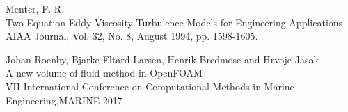 \documentclass[a4paper, 12pt]{report}
\begin{document}
\begin{thebibliography}{9}
	Menter, F. R.\\
	Two-Equation Eddy-Viscosity Turbulence Models for Engineering Applications\\
	AIAA Journal, Vol. 32, No. 8, August 1994, pp. 1598-1605.
	
	Johan Roenby, Bjarke Eltard Larsen, Henrik Bredmose and Hrvoje Jasak\\
	A new volume of fluid method in OpenFOAM\\
	VII International Conference on Computational Methods in Marine Engineering,MARINE 			2017
	
\end{thebibliography}
\end{document}
